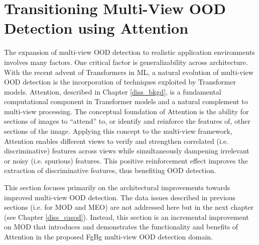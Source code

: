 \section{Transitioning Multi-View OOD Detection using Attention}
\label{sec:propwork-scod}

The expansion of multi-view OOD detection to realistic application environments involves many factors. One critical factor is generalizability across architecture. With the recent advent of Transformers \cite{vaswani2017attention} in ML, a natural evolution of multi-view OOD detection is the incorporation of techniques exploited by Transformer models. Attention, described in Chapter \ref{diss_bkgd}, is a fundamental computational component in Transformer models and a natural complement to multi-view processing. The conceptual foundation of Attention is the ability for sections of images to ``attend'' to, or identify and reinforce the features of, other sections of the image. Applying this concept to the multi-view framework, Attention enables different views to verify and strengthen correlated (i.e. discriminative) features across views while simultaneously dampening irrelevant or noisy (i.e. spurious) features. This positive reinforcement effect improves the extraction of discriminative features, thus benefiting OOD detection.

This section focuses primarily on the architectural improvements towards improved multi-view OOD detection. The data issues described in previous sections (i.e. for MOD and MEO) are not addressed here but in the next chapter (see Chapter \ref{diss_casod}). Instead, this section is an incremental improvement on MOD that introduces and demonstrates the functionality and benefits of Attention in the proposed FgBg multi-view OOD detection domain.


